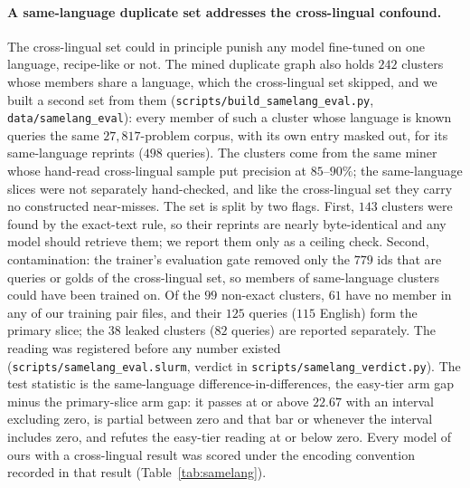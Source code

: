\paragraph{A same-language duplicate set addresses the cross-lingual confound.}
The cross-lingual set could in principle punish any model fine-tuned on one language, recipe-like or not. The mined duplicate graph also holds $242$ clusters whose members share a language, which the cross-lingual set skipped, and we built a second set from them (\texttt{scripts/build\_samelang\_eval.py}, \texttt{data/samelang\_eval}): every member of such a cluster whose language is known queries the same $27{,}817$-problem corpus, with its own entry masked out, for its same-language reprints ($498$ queries). The clusters come from the same miner whose hand-read cross-lingual sample put precision at $85$--$90\%$; the same-language slices were not separately hand-checked, and like the cross-lingual set they carry no constructed near-misses. The set is split by two flags. First, $143$ clusters were found by the exact-text rule, so their reprints are nearly byte-identical and any model should retrieve them; we report them only as a ceiling check. Second, contamination: the trainer's evaluation gate removed only the $779$ ids that are queries or golds of the cross-lingual set, so members of same-language clusters could have been trained on. Of the $99$ non-exact clusters, $61$ have no member in any of our training pair files, and their $125$ queries ($115$ English) form the primary slice; the $38$ leaked clusters ($82$ queries) are reported separately. The reading was registered before any number existed (\texttt{scripts/samelang\_eval.slurm}, verdict in \texttt{scripts/samelang\_verdict.py}). The test statistic is the same-language difference-in-differences, the easy-tier arm gap minus the primary-slice arm gap: it passes at or above $22.67$ with an interval excluding zero, is partial between zero and that bar or whenever the interval includes zero, and refutes the easy-tier reading at or below zero. Every model of ours with a cross-lingual result was scored under the encoding convention recorded in that result (Table~\ref{tab:samelang}).

